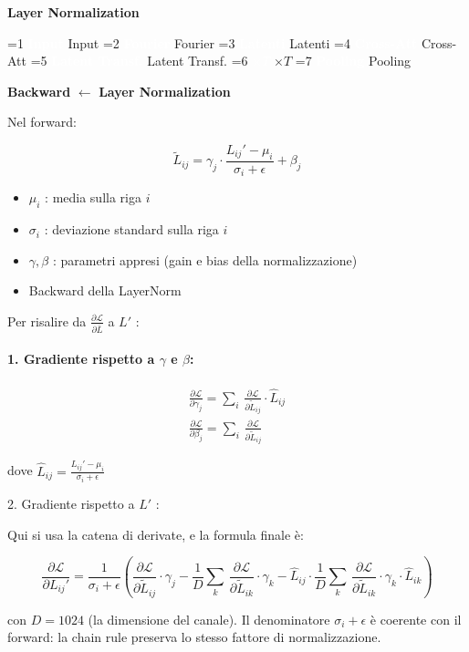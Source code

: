 \documentclass[
  11pt,
]{article}
\newcommand{\currentstep}[1]{%
\begin{tcolorbox}[colback=red!3, colframe=red!40!black, boxrule=0.3pt, arc=2pt,
  left=4pt, right=4pt, top=2pt, bottom=2pt]
{\footnotesize\textbf{Backward} $\longleftarrow$ \textbf{#1}}
\end{tcolorbox}}
\newcommand{\mystripchip}[3]{%
  \setlength{\fboxsep}{2.8pt}%
  \ifnum#3=#1\relax
    \colorbox{seccolor}{\textcolor{white}{\bfseries #2}}%
  \else
    \colorbox{seccolor!8}{\textcolor{seccolor!55}{#2}}%
  \fi}
\newcommand{\mystriparr}{{\fontsize{8}{8}\selectfont\;\textcolor{seccolor!45}{$\rightarrow$}\;}}
\newcommand{\mystrip}[1]{%
\begin{center}
{\sffamily\fontsize{7.5}{9}\selectfont
\mystripchip{1}{Input}{#1}\mystriparr\mystripchip{2}{Fourier}{#1}\mystriparr\mystripchip{3}{Latenti}{#1}\mystriparr%
\mystripchip{4}{Cross-Att}{#1}\mystriparr\mystripchip{5}{Latent Transf.}{#1}\mystriparr%
\mystripchip{6}{$\times T$}{#1}\mystriparr\mystripchip{7}{Pooling}{#1}}
\end{center}}
\renewcommand{\currentstep}[2][0]{%
\mystrip{#1}%
\begin{tcolorbox}[colback=red!3, colframe=red!40!black, boxrule=0.3pt, arc=2pt,
  left=4pt, right=4pt, top=2pt, bottom=2pt]
{\footnotesize\textbf{Backward} $\longleftarrow$ \textbf{#2}}
\end{tcolorbox}}
\begin{document}
\textbf{Layer Normalization}

\currentstep[5]{Layer Normalization}

Nel forward:

\[{\widetilde{L}}_{ij} = \gamma_{j} \cdot \frac{L_{ij}' - \mu_{i}}{\sigma_{i} + \epsilon} + \beta_{j}\]

\begin{itemize}
\item
  \(\mu_{i}\) : media sulla riga \(i\)
\item
  \(\sigma_{i}\) : deviazione standard sulla riga \(i\)
\item
  \(\gamma,\beta\) : parametri appresi (gain e bias della
  normalizzazione)
\item
  Backward della LayerNorm
\end{itemize}

Per risalire da \(\frac{\partial\mathcal{L}}{\partial\bar{L}}\) a \(L'\)
:

\paragraph{1. Gradiente rispetto a $\gamma$ e $\beta$:}

\[\begin{matrix}
\frac{\partial\mathcal{L}}{\partial\gamma_{j}} = \sum_{i}^{}\,\frac{\partial\mathcal{L}}{\partial{\widetilde{L}}_{ij}} \cdot {\widehat{L}}_{ij} \\
\frac{\partial\mathcal{L}}{\partial\beta_{j}} = \sum_{i}^{}\,\frac{\partial\mathcal{L}}{\partial{\widetilde{L}}_{ij}}
\end{matrix}\]

dove
\({\widehat{L}}_{ij} = \frac{L_{ij}' - \mu_{i}}{\sigma_{i} + \epsilon}\)

2. Gradiente rispetto a \(L'\) :

Qui si usa la catena di derivate, e la formula finale è:

\[\frac{\partial\mathcal{L}}{\partial L_{ij}'} = \frac{1}{\sigma_{i} + \epsilon}\left( \frac{\partial\mathcal{L}}{\partial{\widetilde{L}}_{ij}} \cdot \gamma_{j} - \frac{1}{D}\sum_{k}^{}\,\frac{\partial\mathcal{L}}{\partial{\widetilde{L}}_{ik}} \cdot \gamma_{k} - {\widehat{L}}_{ij} \cdot \frac{1}{D}\sum_{k}^{}\,\frac{\partial\mathcal{L}}{\partial{\widetilde{L}}_{ik}} \cdot \gamma_{k} \cdot {\widehat{L}}_{ik} \right)\]

con \(D = 1024\) (la dimensione del canale). Il denominatore $\sigma_i + \epsilon$ è coerente con il forward: la chain rule preserva lo stesso fattore di normalizzazione.
\end{document}
